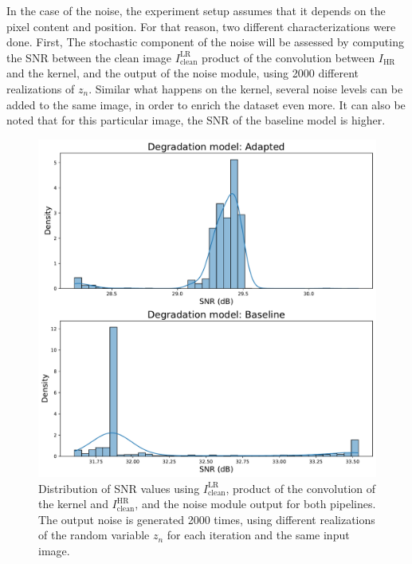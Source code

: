         In the case of the noise, the experiment setup assumes that it depends on the pixel content and position.
        For that reason, two different characterizations were done. 
        First, The stochastic component of the noise will be assessed by computing the SNR between the clean image $I^{\text{LR}}_{\text{clean}}$ product of the convolution between $I_{\text{HR}}$ and the kernel, and the output of the noise module, using 2000 different realizations of $z_n$.
        Similar what happens on the kernel, several noise levels can be added to the same image, in order to enrich the dataset even more. It can also be noted that for this particular image, the SNR of the baseline model is higher.

        
        \begin{figure}[H]
            \centering
            \includegraphics[width=\textwidth]{Includes/5-source-noise-1-sample.pdf}
            \caption{Distribution of SNR values using $I^{\text{LR}}_{\text{clean}}$, product of the convolution of the kernel and $I^{\text{HR}}_{\text{clean}}$, and the noise module output for both pipelines.
                     The output noise is generated 2000 times, using different realizations of the random variable $z_n$ for each iteration and the same input image.
                    }
            \label{fig:5-source-noise-1-sample}
        \end{figure}
        

